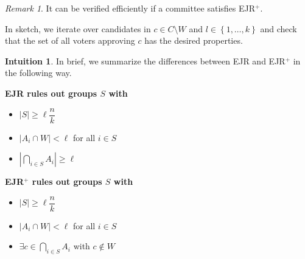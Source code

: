 \documentclass{book}
\theoremstyle{plain}
\theoremstyle{definition}
\newtheorem{intuition}[theorem]{Intuition}
\theoremstyle{remark}
\newtheorem{remark}[theorem]{Remark}
\newcommand{\set}[1]{\left\{#1\right\}}
\begin{document}
\begin{remark}
    It can be verified efficiently if 
    a committee satisfies EJR$^+$.

    In sketch, we iterate over candidates in $c \in C \setminus W$ and 
    $l \in \set{1, \dots, k}$ and check that
    the set of all voters approving 
    $c$ has the desired properties.
\end{remark}


\begin{intuition}   
    In brief, we summarize the differences between 
    EJR and EJR$^+$ in the following way. 
    \begin{center}
    \begin{minipage}{0.45\textwidth}
    \begin{tcolorbox}[colback=gray!10, colframe=gray!50, title={}]
        \centering \textbf{\textcolor{blue!70!black}{EJR} rules out groups $S$ with}

        \begin{itemize}
            \item $|S| \geq \ell \dfrac{n}{k}$
            \item $|A_i \cap W| < \ell$ for all $i \in S$
            \item {\color{purple} $\left|\displaystyle\bigcap_{i \in S} A_i\right| \geq \ell$}
        \end{itemize}
    \end{tcolorbox}
    \end{minipage}%
    \hspace{1em}%
    \begin{minipage}{0.45\textwidth}
    \begin{tcolorbox}[colback=gray!10, colframe=gray!50, title={}]
        \centering \textbf{\textcolor{blue!70!black}{EJR$^+$} rules out groups $S$ with}

        \begin{itemize}
            \item $|S| \geq \ell \dfrac{n}{k}$
            \item $|A_i \cap W| < \ell$ for all $i \in S$
            \item {\color{purple} $\exists c \in \displaystyle\bigcap_{i \in S} A_i$ with $c \notin W$}
        \end{itemize}
    \end{tcolorbox}
    \end{minipage}
    \end{center}
\end{intuition}
\end{document}
